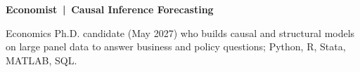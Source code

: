 {\centering\color{accent}\bfseries Economist \,|\, Causal Inference \textperiodcentered{} Forecasting\par}\vspace{3pt}
Economics Ph.D. candidate (May 2027) who builds causal and structural models on large panel data
to answer business and policy questions; Python, R, Stata, MATLAB, SQL.
